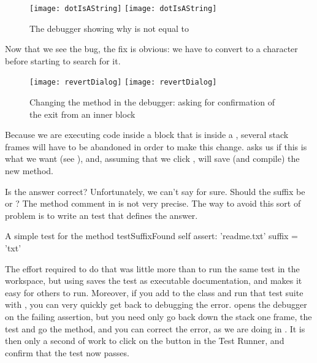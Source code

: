 \documentclass[a4paper,10pt,twoside]{book}
\begin{document}
\begin{figure}[btp]
	\begin{center}
	\ifluluelse
		{\texttt{[image: dotIsAString]}}
		{\texttt{[image: dotIsAString]}}
	\end{center}
	\caption{The debugger showing why  is not equal to }
	\label{fig:dotIsAString}
\end{figure}

Now that we see the bug, the fix is obvious: we have to convert  to a character before starting to search for it.  

\begin{figure}[btp]
	\begin{center}
	\ifluluelse
		{\texttt{[image: revertDialog]}}
		{\texttt{[image: revertDialog]}}
	\end{center}
	\caption{Changing the  method in the debugger: asking for confirmation of the exit from an inner block}
	\label{fig:revertDialog}
\end{figure}

Because we are executing code inside a block that is inside a , several stack frames will have to be abandoned in order to make this change.  \sq asks us if this is what we want (see ), and, assuming that we click , will save (and compile) the new method.


Is the answer correct?  Unfortunately, we can't say for sure.  Should the suffix be  or ?
The method comment in  is not very precise.  
The way to avoid this sort of problem is to write an  test that defines the answer.

\begin{method}[testSuffix]{A simple test for the  method}
testSuffixFound
	self assert: 'readme.txt' suffix = 'txt'
\end{method}

The effort required to do that was little more than to run the same test in the workspace, but using \sunit saves the test as executable documentation, and makes it easy for others to run.
Moreover, if you add  to the class  and run that test suite with \sunit, you can very quickly get back to debugging the error.
\sunit opens the debugger on the failing assertion, but you need only go back down the stack one frame,  the test and go  the  method, and you can correct the error, as we are doing in .
It is then only  a second of work to click on the  button in the \sunit Test Runner, and confirm that the test now passes.
\end{document}

